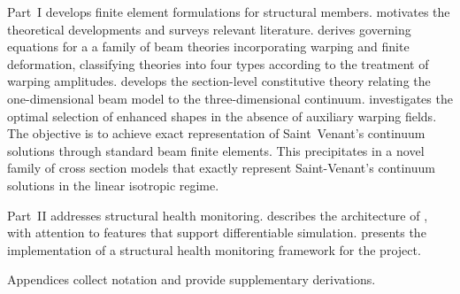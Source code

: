 Part~I develops finite element formulations for structural members.
 motivates the theoretical developments and surveys relevant literature.
 derives governing equations for a a family of beam theories incorporating warping and finite deformation, classifying theories into four types according to the treatment of warping amplitudes.
 develops the section-level constitutive theory relating the one-dimensional beam model to the three-dimensional continuum.
 investigates the optimal selection of enhanced shapes in the absence of auxiliary warping fields. The objective is to achieve exact representation of Saint~Venant's continuum solutions through standard beam finite elements. This precipitates in a novel family of cross section models that exactly represent Saint-Venant's continuum solutions in the linear isotropic regime. 

Part~II addresses structural health monitoring.
 describes the architecture of \Xara{}, with attention to features that support differentiable simulation.
 presents the implementation of a structural health monitoring framework for the \BRACE{} project.

Appendices collect notation and provide supplementary derivations.

